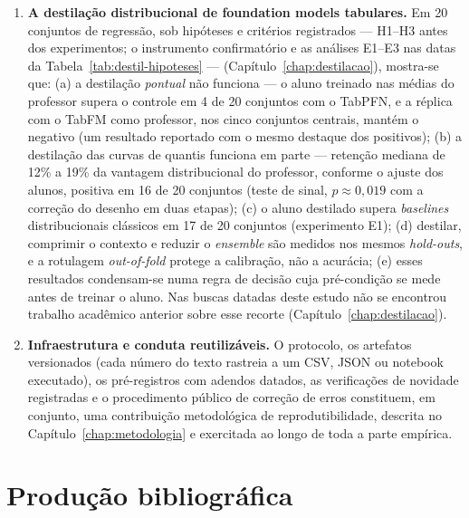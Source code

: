 \begin{enumerate}
    experimento E2 localiza o ponto de inversão (basta deslocar 10 a 20\%
    do peso da acurácia para a latência --- pela mediana do
    \emph{regret}, na normalização por postos
    adotada --- para a recomendação virar),
    justificando quantitativamente a arquitetura do fluxograma
    (Capítulo~\ref{chap:framework}).
  \item \textbf{A destilação distribucional de foundation models
    tabulares.} Em 20 conjuntos de regressão, sob hipóteses
    e critérios registrados --- H1--H3 antes dos experimentos; o
    instrumento confirmatório e as análises E1--E3 nas datas da
    Tabela~\ref{tab:destil-hipoteses} ---
    (Capítulo~\ref{chap:destilacao}), mostra-se que: (a) a destilação
    \emph{pontual} não funciona --- o aluno treinado nas médias do
    professor supera o controle em 4 de 20 conjuntos com o TabPFN, e
    a réplica com o TabFM como professor, nos cinco conjuntos
    centrais, mantém o negativo (um resultado reportado com
    o mesmo destaque dos positivos); (b) a destilação das curvas de quantis
    funciona em parte --- retenção mediana de 12\% a 19\% da vantagem
    distribucional do professor, conforme o ajuste dos alunos,
    positiva em 16 de 20 conjuntos (teste de sinal,
    $p\approx0{,}019$ com a correção do desenho em duas etapas); (c) o
    aluno destilado supera \emph{baselines} distribucionais clássicos
    em 17 de 20 conjuntos (experimento E1); (d) destilar, comprimir o
    contexto e reduzir o \emph{ensemble} são medidos nos mesmos
    \emph{hold-outs}, e a rotulagem \emph{out-of-fold} protege a
    calibração, não a acurácia; (e) esses resultados condensam-se numa
    regra de decisão cuja pré-condição se mede antes de treinar o
    aluno. Nas buscas
    datadas deste estudo não se encontrou trabalho acadêmico anterior
    sobre esse recorte (Capítulo~\ref{chap:destilacao}).
  \item \textbf{Infraestrutura e conduta reutilizáveis.} O protocolo, os
    artefatos versionados (cada número do texto rastreia a um CSV,
    JSON ou notebook executado), os pré-registros com adendos datados, as
    verificações de novidade registradas e o procedimento público de
    correção de erros
    constituem, em conjunto, uma contribuição metodológica de
    reprodutibilidade, descrita no Capítulo~\ref{chap:metodologia} e
    exercitada ao longo de toda a parte empírica.
\end{enumerate}

\section{Produção bibliográfica}
\label{sec:intro-producao}

